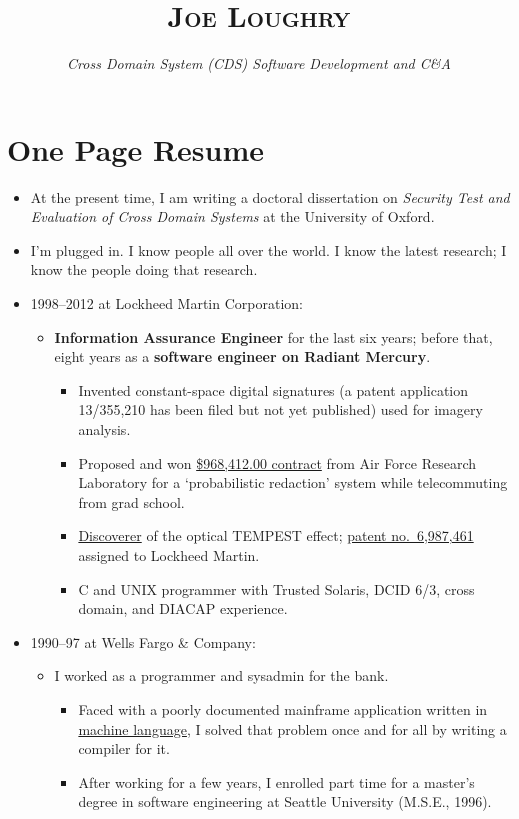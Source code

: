 \documentclass[12pt,letterpaper]{article}
\date{}
\title{\textsc{Joe Loughry}\vspace{-7mm}}
\author{\emph{Cross Domain System (CDS) Software Development and C\&A}}
\begin{document}
\maketitle
\thispagestyle{empty}

\vspace*{-20mm}
\section*{One Page Resume}

\begin{itemize}
	\item At the present time, I am writing a doctoral dissertation on \emph{Security Test and
		Evaluation of Cross Domain Systems} at the University of Oxford.
	\item I'm plugged in.  I know people all over the world.  I know the latest research; I
		know the people doing that research.
	\item 1998--2012 at Lockheed Martin Corporation:
		\begin{itemize}
			\item \textbf{Information Assurance Engineer} for the last six years; before that,
				eight years as a \textbf{software engineer on Radiant Mercury}.
				\begin{itemize}
					\item Invented constant-space digital signatures (a patent application
						13/355,210 has been filed but not yet published) used for
						imagery analysis.
					\item Proposed and won
						\href{http://applied-math.org/Probabilistic_Redaction.pdf}{\$968,412.00
						contract} from Air Force Research Laboratory for a `probabilistic
						redaction' system while telecommuting from grad school.
					\item \href{http://applied-math.org/acm_optical_tempest.pdf}{Discoverer}
						of the optical TEMPEST effect;
						\href{http://www.google.com/patents/US6987461}{patent no.\ 6,987,461}
						assigned to Lockheed Martin.
					\item C and UNIX programmer with Trusted Solaris, DCID 6/3, cross domain,
						and DIACAP experience.
				\end{itemize}
		\end{itemize}

	\item 1990--97 at Wells Fargo \& Company:
		\begin{itemize}
			\item I worked as a programmer and sysadmin for the bank.
				\begin{itemize}
					\item Faced with a poorly documented mainframe application written in
						\href{https://github.com/jloughry/BANCStar/blob/master/README.md#code-sample}{machine language},
						I solved that problem once and for all by writing a compiler for it.
					\item After working for a few years, I enrolled part time for a master's
						degree in software engineering at Seattle University (M.S.E., 1996).
				\end{itemize}
		\end{itemize}


\end{itemize}
\end{document}
